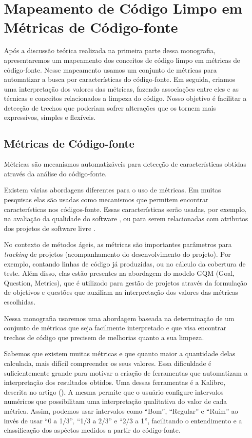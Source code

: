 \chapter{Mapeamento de Código Limpo em Métricas de Código-fonte}
\label{chap:mapeamento}	

	Após a discussão teórica realizada na primeira parte dessa 	monografia, apresentaremos um mapeamento dos conceitos de código limpo em métricas de código-fonte. Nesse mapeamento usamos um conjunto de métricas para automatizar a busca por características do código-fonte. Em seguida, criamos uma interpretação dos valores das métricas, fazendo associações entre eles e as técnicas e conceitos relacionados a limpeza do código. Nosso objetivo é facilitar a detecção de trechos que poderiam sofrer alterações que os tornem mais expressivos, simples e flexíveis.


\section{Métricas de Código-fonte}

	Métricas são mecanismos automatizáveis para detecção de características obtidas através da análise do código-fonte.
	
	Existem várias abordagens diferentes para o uso de métricas. Em muitas pesquisas elas são usadas como mecanismos que permitem encontrar características nos códigos-fonte. Essas características serão usadas, por exemplo, na avaliação da qualidade do software \citep{meirelles:sbqs09}, ou para serem relacionadas com atributos dos projetos de software livre \citep{meirelles2010}. 
	
	No contexto de métodos ágeis, as métricas são importantes parâmetros para \textit{tracking} de projetos (acompanhamento do desenvolvimento do projeto). Por exemplo, contando linhas de código já produzidas, ou no cálculo da cobertura de teste.	Além disso, elas estão presentes na abordagem do modelo GQM (Goal, Question, Metrics), que é utilizado para gestão de projetos através da formulação de objetivos e questões que auxiliam na interpretação dos valores das métricas escolhidas.
	
	Nessa monografia usaremos uma abordagem baseada na determinação de um conjunto de métricas que seja facilmente interpretado e que visa encontrar trechos de código que precisem de melhorias quanto a sua limpeza.
	
	Sabemos que existem muitas métricas e que quanto maior a quantidade delas calculada, mais difícil compreender os seus valores. Essa dificuldade é suficientemente grande para motivar a criação de ferramentas que automatizam a interpretação dos resultados obtidos.	Uma dessas ferramentas é a Kalibro, descrita no artigo (\citep{meirelles:sbes09}). A mesma permite que o usuário configure intervalos numéricos que possibilitam uma interpretação qualitativa do valor de cada métrica. Assim, podemos usar intervalos como ``Bom'', ``Regular'' e ``Ruim'' ao invés de usar ``0 a 1/3'', ``1/3 a 2/3'' e ``2/3 a 1'', facilitando o entendimento e a classificação dos aspéctos medidos a partir do código-fonte.
	
